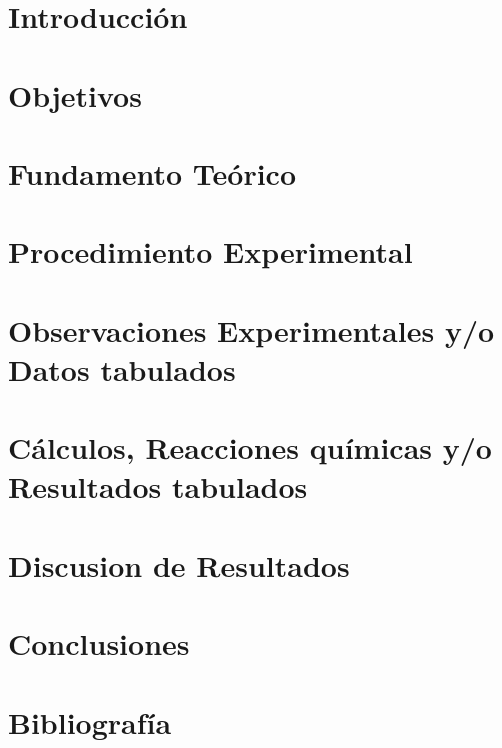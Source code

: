 \documentclass[12pt, a4paper]{article}
\begin{document}


\pagestyle{fancy}
\fancyfoot{} %
\fancyfoot[R]{\thepage}

\tableofcontents
\clearpage

\section{Introducción} %


\section{Objetivos} %


\section{Fundamento Teórico} %


\section{Procedimiento Experimental}


\section{Observaciones Experimentales y/o Datos tabulados} %


\section{Cálculos, Reacciones químicas y/o Resultados tabulados}


\section{Discusion de Resultados}


\section{Conclusiones}


\section{Bibliografía}
\renewcommand{\bibsection}{}


\clearpage

\listoffigures
\listoftables

\clearpage
\end{document}

